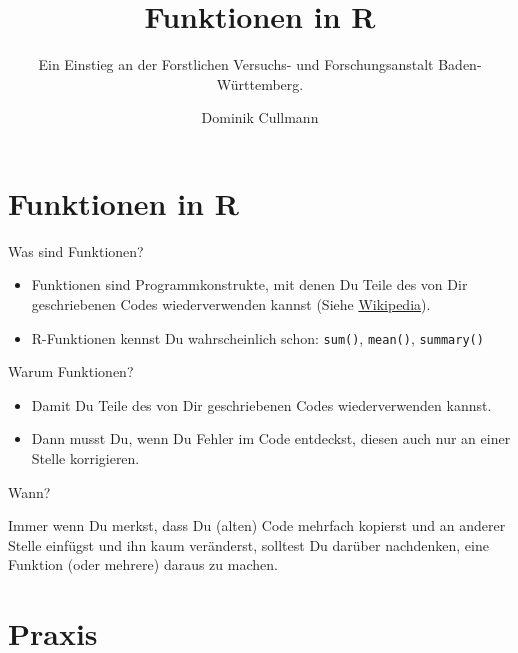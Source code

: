 \documentclass[compress]{beamer}
\title{Funktionen in \textbf{R}}
\subtitle{Ein Einstieg an der Forstlichen Versuchs- und Forschungsanstalt
Baden-Württemberg.}
\author{Dominik Cullmann}
\date{}
\providecommand{\tightlist}{%
  \setlength{\itemsep}{0pt}\setlength{\parskip}{0pt}}
\begin{document}
\frame{\titlepage}

\section{Funktionen in R}\label{funktionen-in-r}

\begin{frame}[fragile]{Was sind Funktionen?}

\begin{itemize}
\tightlist
\item
  Funktionen sind Programmkonstrukte, mit denen Du Teile des von Dir
  geschriebenen Codes wiederverwenden kannst (Siehe
  \href{https://de.wikipedia.org/wiki/Funktion_(Programmierung)}{Wikipedia}).
\item
  R-Funktionen kennst Du wahrscheinlich schon: \texttt{sum()},
  \texttt{mean()}, \texttt{summary()}
\end{itemize}

\end{frame}

\begin{frame}{Warum Funktionen?}

\begin{itemize}
\tightlist
\item
  Damit Du Teile des von Dir geschriebenen Codes wiederverwenden kannst.
\item
  Dann musst Du, wenn Du Fehler im Code entdeckst, diesen auch nur an
  einer Stelle korrigieren.
\end{itemize}

\begin{block}{Wann?}

Immer wenn Du merkst, dass Du (alten) Code mehrfach kopierst und an
anderer Stelle einfügst und ihn kaum veränderst, solltest Du darüber
nachdenken, eine Funktion (oder mehrere) daraus zu machen.

\end{block}

\end{frame}

\section{Praxis}\label{praxis}
\end{document}
